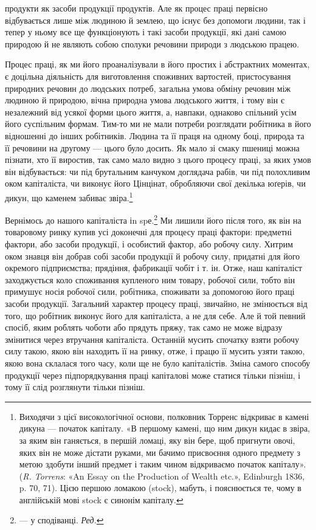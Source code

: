 \parcont{}  %
продукти як засоби продукції продуктів. Але як процес праці
первісно відбувається лише між людиною й землею, що існує
без допомоги людини, так і тепер у ньому все ще функціонують
і такі засоби продукції, які дані самою природою й не являють
собою сполуки речовини природи з людською працею.

Процес праці, як ми його проаналізували в його простих і абстрактних
моментах, є доцільна діяльність для виготовлення
споживних вартостей, пристосування природних речовин до
людських потреб, загальна умова обміну речовин між людиною
й природою, вічна природна умова людського життя, і тому він
є незалежний від усякої форми цього життя, а, навпаки, однаково
спільний усім його суспільним формам. Тим-то ми не мали
потреби розглядати робітника в його відношенні до інших робітників.
Людина та її праця на одному боці, природа та її речовини
на другому — цього було досить. Як мало зі смаку пшениці
можна пізнати, хто її виростив, так само мало видно з цього процесу
праці, за яких умов він відбувається: чи під брутальним
канчуком доглядача рабів, чи під полохливим оком капіталіста,
чи виконує його Цінцінат, обробляючи свої декілька юґерів,
чи дикун, що каменем забиває звіра.\footnote{
Виходячи з цієї високологічної основи, полковник Торренс відкриває
в камені дикуна — початок капіталу. «В першому камені, що ним
дикун кидає в звіра, за яким він ганяється, в першій ломаці, яку він бере,
щоб пригнути овочі, яких він не може дістати руками, ми бачимо присвоєння
одного предмету з метою здобути інший предмет і таким чином
відкриваємо початок капіталу». (\emph{R. Torrens}: «An Essay on the
Production of Wealth etc.», Edinburgh 1836, p. 70, 71). Цією першою
ломакою (stock), мабуть, і пояснюється те, чому в англійській мові stock
є синонім капіталу.
}

Вернімось до нашого капіталіста іn spе.\footnote*{
— у сподіванці. \emph{Ред.}
} Ми лишили його
після того, як він на товаровому ринку купив усі доконечні
для процесу праці фактори: предметні фактори, або засоби продукції,
і особистий фактор, або робочу силу. Хитрим оком знавця
він добрав собі засоби продукції й робочу силу, придатні для
його окремого підприємства; прядіння, фабрикації чобіт і т. ін.
Отже, наш капіталіст заходжується коло споживання купленого
ним товару, робочої сили, тобто він примушує носія робочої сили,
робітника, споживати за допомогою його праці засоби продукції.
Загальний характер процесу праці, звичайно, не змінюється від
того, що робітник виконує його для капіталіста, а не для себе.
Але й той певний спосіб, яким роблять чоботи або прядуть пряжу,
так само не може відразу змінитися через втручання капіталіста.
Останній мусить спочатку взяти робочу силу такою, якою він
находить її на ринку, отже, і працю її мусить узяти такою, якою
вона склалася того часу, коли ще не було капіталістів. Зміна
самого способу продукції через підпорядкування праці капіталові
може статися тільки пізніш, і тому її слід розглянути
тільки пізніш.
